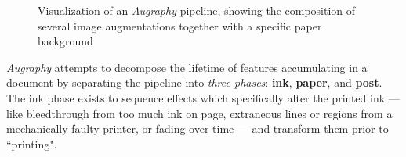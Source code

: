 \documentclass[runningheads]{llncs}
\begin{document}
\begin{figure}
\centering
{}
\caption{Visualization of an \emph{Augraphy} pipeline, showing the composition of several image augmentations together with a specific paper background}
\label{fig:pipeline}
\end{figure}

\emph{Augraphy} attempts to decompose the lifetime of features accumulating in a document by separating the pipeline into \emph{three phases}: \textbf{ink}, \textbf{paper}, and \textbf{post}.
The ink phase exists to sequence effects which specifically alter the printed ink --- like bleedthrough from too much ink on page, extraneous lines or regions from a mechanically-faulty printer, or fading over time --- and transform them prior to ``printing".
\end{document}
